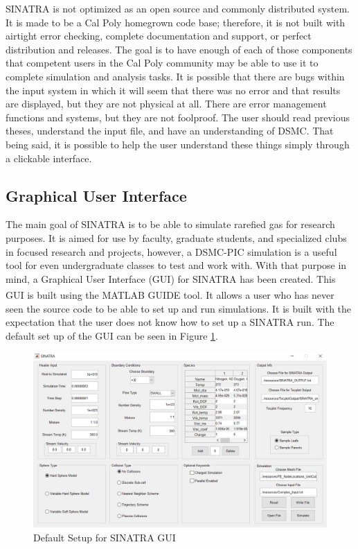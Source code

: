 \indent SINATRA is not optimized as an open source and commonly distributed system. It is made to be a Cal Poly homegrown code base; therefore, it is not built with airtight error checking, complete documentation and support, or perfect distribution and releases. The goal is to have enough of each of those components that competent users in the Cal Poly community may be able to use it to complete simulation and analysis tasks. It is possible that there are bugs within the input system in which it will seem that there was no error and that results are displayed, but they are not physical at all. There are error management functions and systems, but they are not foolproof. The user should read previous theses, understand the input file, and have an understanding of DSMC. That being said, it is possible to help the user understand these things simply through a clickable interface.

\subsection{Graphical User Interface}
The main goal of SINATRA is to be able to simulate rarefied gas for research purposes. It is aimed for use by faculty, graduate students, and specialized clubs in focused research and projects, however, a DSMC-PIC simulation is a useful tool for even undergraduate classes to test and work with. With that purpose in mind, a Graphical User Interface (GUI) for SINATRA has been created. This GUI is built using the MATLAB\textsuperscript{\textregistered} GUIDE tool. It allows a user who has never seen the source code to be able to set up and run simulations. It is built with the expectation that the user does not know how to set up a SINATRA run. The default set up of the GUI can be seen in Figure \ref{fig:SinatraGUI}. \par

\begin{figure}
\includegraphics[width=.95\textwidth]{figures/SINATRA_GUI.JPG}
\centering
\caption{Default Setup for SINATRA GUI}
\label{fig:SinatraGUI}
\end{figure}


